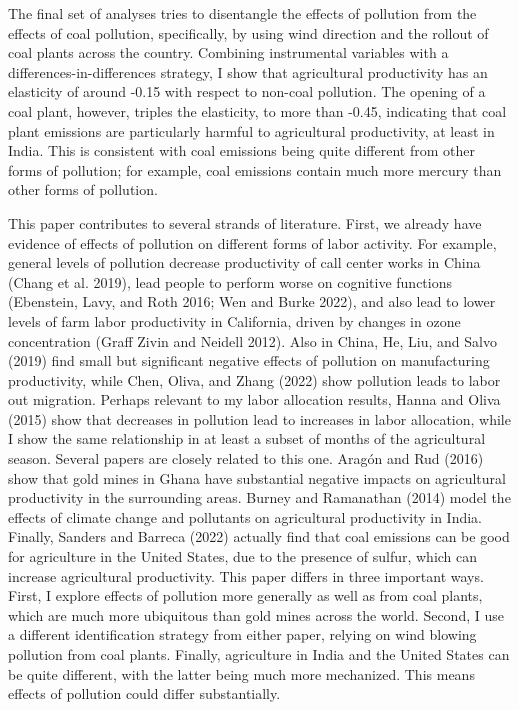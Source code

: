 \documentclass[
]{article}
\begin{document}
The final set of analyses tries to disentangle the effects of pollution from the effects of coal pollution, specifically, by using wind direction and the rollout of coal plants across the country. Combining instrumental variables with a differences-in-differences strategy, I show that agricultural productivity has an elasticity of around -0.15 with respect to non-coal pollution. The opening of a coal plant, however, triples the elasticity, to more than -0.45, indicating that coal plant emissions are particularly harmful to agricultural productivity, at least in India. This is consistent with coal emissions being quite different from other forms of pollution; for example, coal emissions contain much more mercury than other forms of pollution.

This paper contributes to several strands of literature. First, we already have evidence of effects of pollution on different forms of labor activity. For example, general levels of pollution decrease productivity of call center works in China (Chang et al. 2019), lead people to perform worse on cognitive functions (Ebenstein, Lavy, and Roth 2016; Wen and Burke 2022), and also lead to lower levels of farm labor productivity in California, driven by changes in ozone concentration (Graff Zivin and Neidell 2012). Also in China, He, Liu, and Salvo (2019) find small but significant negative effects of pollution on manufacturing productivity, while Chen, Oliva, and Zhang (2022) show pollution leads to labor out migration. Perhaps relevant to my labor allocation results, Hanna and Oliva (2015) show that decreases in pollution lead to increases in labor allocation, while I show the same relationship in at least a subset of months of the agricultural season. Several papers are closely related to this one. Aragón and Rud (2016) show that gold mines in Ghana have substantial negative impacts on agricultural productivity in the surrounding areas. Burney and Ramanathan (2014) model the effects of climate change and pollutants on agricultural productivity in India. Finally, Sanders and Barreca (2022) actually find that coal emissions can be good for agriculture in the United States, due to the presence of sulfur, which can increase agricultural productivity. This paper differs in three important ways. First, I explore effects of pollution more generally as well as from coal plants, which are much more ubiquitous than gold mines across the world. Second, I use a different identification strategy from either paper, relying on wind blowing pollution from coal plants. Finally, agriculture in India and the United States can be quite different, with the latter being much more mechanized. This means effects of pollution could differ substantially.
\end{document}
